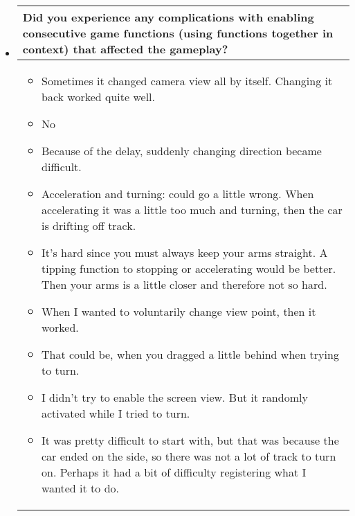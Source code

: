 \begin{itemize}
\item[]
\begin{table}[!htb]
\centering
\begin{tabular}{| p{5.5in} |}
\hline
	\cellcolor{NotSkyBlue}\textbf{Did you experience any complications with enabling consecutive game functions (using functions together in context) that affected the gameplay? }
	\\
	\hline
	\begin{itemize}
        \item Sometimes it changed camera view all by itself. Changing it back worked quite well.
        \item No
        \item Because of the delay, suddenly changing direction became difficult.
        \item Acceleration and turning:  could go a little wrong.  When accelerating it was a little too much and turning, then the car is drifting off track.
        \item It’s hard since you must always keep your arms straight.  A tipping function to stopping or accelerating would be better. Then your arms is a little closer and therefore not so hard.
        \item When I wanted to voluntarily change view point, then it worked.
        \item That could be, when you dragged a little behind when trying to turn.
        \item I didn’t try to enable the screen view. But it randomly activated while I tried to turn.
        \item It was pretty difficult to start with, but that was because the car ended on the side, so there was not a lot of track to turn on. Perhaps it had a bit of difficulty registering what I wanted it to do.

	\end{itemize}
	\\
	\hline
\end{tabular}
\end{table}


\end{itemize}

